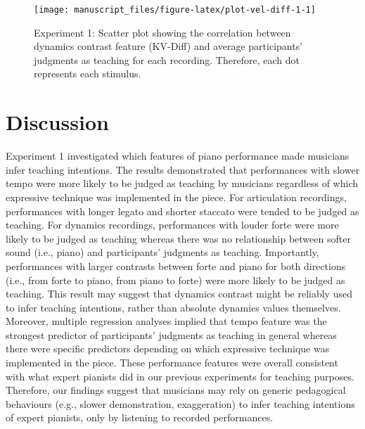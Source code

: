 \documentclass[
  man,floatsintext]{apa6}
\begin{document}
\begin{figure}

{\centering \texttt{[image: manuscript\_files/figure-latex/plot-vel-diff-1-1]} 

}

\caption{\label{fig:vel-diff-1}Experiment 1: Scatter plot showing the correlation between dynamics contrast feature (KV-Diff) and average participants' judgments as teaching for each recording. Therefore, each dot represents each stimulus.}\label{fig:plot-vel-diff-1}
\end{figure}

\clearpage

\hypertarget{discussion}{%
\section{Discussion}\label{discussion}}

Experiment 1 investigated which features of piano performance made musicians infer teaching intentions. The results demonstrated that performances with slower tempo were more likely to be judged as teaching by musicians regardless of which expressive technique was implemented in the piece. For articulation recordings, performances with longer legato and shorter staccato were tended to be judged as teaching. For dynamics recordings, performances with louder forte were more likely to be judged as teaching whereas there was no relationship between softer sound (i.e., piano) and participants' judgments as teaching. Importantly, performances with larger contrasts between forte and piano for both directions (i.e., from forte to piano, from piano to forte) were more likely to be judged as teaching. This result may suggest that dynamics contrast might be reliably used to infer teaching intentions, rather than absolute dynamics values themselves. Moreover, multiple regression analyses implied that tempo feature was the strongest predictor of participants' judgments as teaching in general whereas there were specific predictors depending on which expressive technique was implemented in the piece. These performance features were overall consistent with what expert pianists did in our previous experiments for teaching purposes. Therefore, our findings suggest that musicians may rely on generic pedagogical behaviours (e.g., slower demonstration, exaggeration) to infer teaching intentions of expert pianists, only by listening to recorded performances.

\clearpage
\end{document}

